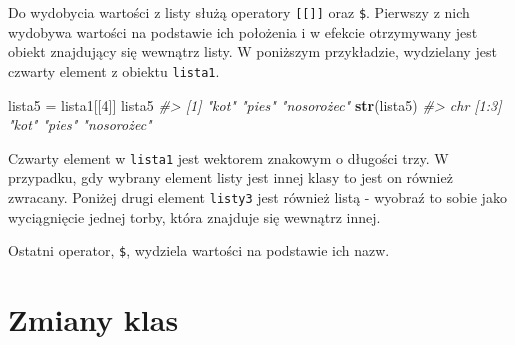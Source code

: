 \documentclass[paper=6in:9in,pagesize=pdftex,headinclude=on,footinclude=on,10pt]{scrbook}
\newenvironment{Shaded}{\begin{snugshade}}{\end{snugshade}}
\newcommand{\CommentTok}[1]{\textcolor[rgb]{0.56,0.35,0.01}{\textit{#1}}}
\newcommand{\DecValTok}[1]{\textcolor[rgb]{0.00,0.00,0.81}{#1}}
\newcommand{\KeywordTok}[1]{\textcolor[rgb]{0.13,0.29,0.53}{\textbf{#1}}}
\newcommand{\NormalTok}[1]{#1}
\newcommand{\OperatorTok}[1]{\textcolor[rgb]{0.81,0.36,0.00}{\textbf{#1}}}
\newcommand{\StringTok}[1]{\textcolor[rgb]{0.31,0.60,0.02}{#1}}
\begin{document}
Do wydobycia wartości z listy służą operatory \texttt{{[}{[}{]}{]}} oraz \texttt{\$}.
Pierwszy z nich wydobywa wartości na podstawie ich położenia i w efekcie otrzymywany jest obiekt znajdujący się wewnątrz listy.
W poniższym przykładzie, wydzielany jest czwarty element z obiektu \texttt{lista1}.

\begin{Shaded}
\begin{Highlighting}[]
\NormalTok{lista5 =}\StringTok{ }\NormalTok{lista1[[}\DecValTok{4}\NormalTok{]]}
\NormalTok{lista5}
\CommentTok{#> [1] "kot"       "pies"      "nosorożec"}
\KeywordTok{str}\NormalTok{(lista5)}
\CommentTok{#>  chr [1:3] "kot" "pies" "nosorożec"}
\end{Highlighting}
\end{Shaded}

Czwarty element w \texttt{lista1} jest wektorem znakowym o długości trzy.
W przypadku, gdy wybrany element listy jest innej klasy to jest on również zwracany.
Poniżej drugi element \texttt{listy3} jest również listą - wyobraź to sobie jako wyciągnięcie jednej torby, która znajduje się wewnątrz innej.

\begin{Shaded}
\end{Shaded}

Ostatni operator, \texttt{\$}, wydziela wartości na podstawie ich nazw.

\begin{Shaded}
\end{Shaded}

\hypertarget{zmiany-klas}{%
\section{Zmiany klas}\label{zmiany-klas}}
\end{document}
